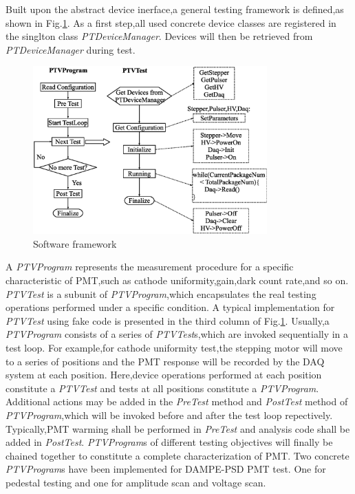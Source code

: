 \documentclass[preprint,5p,times]{elsarticle}
\begin{document}
Built upon the abstract device inerface,a general testing framework is defined,as shown in Fig.\ref{fig:software_framework}.
As a first step,all used concrete device classes are registered in the singlton class \textit{PTDeviceManager}.
Devices will then be retrieved from \textit{PTDeviceManager} during test.
\begin{figure}[h!]
\centering
 \includegraphics[width=90mm]{software_framework}
\caption{Software framework}
\label{fig:software_framework}
\end{figure}
A \textit{PTVProgram} represents the measurement procedure for a specific characteristic of PMT,such as cathode uniformity,gain,dark count rate,and so on.
\textit{PTVTest} is a subunit of \textit{PTVProgram},which encapsulates the real testing operations performed under a specific condition.
A typical implementation for \textit{PTVTest} using fake code is presented in the third column of Fig.\ref{fig:software_framework}.
Usually,a \textit{PTVProgram} consists of a series of \textit{PTVTest}s,which are invoked sequentially in a test loop.
For example,for cathode uniformity test,the stepping motor will move to a series of positions and the PMT response will be recorded by the DAQ system at each position.
Here,device operations performed at each position constitute a \textit{PTVTest} and tests at all positions constitute a \textit{PTVProgram}.
Additional actions may be added in the \textit{PreTest} method and \textit{PostTest} method of \textit{PTVProgram},which will be invoked before and after the test loop repectively.
Typically,PMT warming shall be performed in \textit{PreTest} and analysis code shall be added in \textit{PostTest}.
\textit{PTVProgram}s of different testing objectives will finally be chained together to constitute a complete characterization of PMT.
Two concrete \textit{PTVProgram}s have been implemented for DAMPE-PSD PMT test.
One for pedestal testing and one for amplitude scan and voltage scan.
\end{document}
